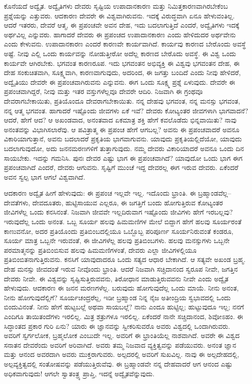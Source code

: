 ಕೊನೆಯದೆ ಅದ್ವೈತ. ಅದ್ವೈತಿಗಳು ದೇವರು ಸೃಷ್ಟಿಯ ಉಪಾದಾನಕಾರಣ ಮತ್ತು ನಿಮಿತ್ತಕಾರಣವಾಗಿರಬೇಕೆಂಬ ಪ್ರಶ್ನೆಯನ್ನು ಎತ್ತುವರು. ಆದಕಾರಣ ದೇವರೇ ಈ ವಿಶ್ವವಾಗಿರುವನು. ಇದಕ್ಕೆ ವಿರುದ್ಧವಾಗಿ ಏನೂ ಹೇಳುವಂತಿಲ್ಲ. ಆದರೆ ಇತರರು, ದೇವರೆ ಆತ್ಮ, ಈ ಪ್ರಪಂಚವೇ ಅವನ ದೇಹ, ಇದು ಬದಲಾಗುತ್ತಿದೆ ಎಂದರೆ, ಅದ್ವೈತಿಗಳು ಇದಕ್ಕೆ ಅರ್ಥವಿಲ್ಲ ಎನ್ನುವರು. ಹಾಗಾದರೆ ದೇವರು ಈ ಪ್ರಪಂಚದ ಉಪಾದಾನಕಾರಣ ಎಂದು ಹೇಳಿದುದರ ಅರ್ಥವೇನು ಎಂದು ಕೇಳುವನು. ಉಪಾದಾನಕಾರಣ ಎಂದರೆ ಕಾರಣವೇ ಕಾರ್ಯವಾಗಿದೆ. ಕಾರ್ಯವು ಕಾರಣದ ಬೇರೊಂದು ಅವಸ್ಥೆ ಅಷ್ಟೆ. ನೀವು ಎಲ್ಲಿ ಒಂದು ಕಾರ್ಯವನ್ನು ನೋಡುತ್ತೀರೋ ಅದೆಲ್ಲ ಕಾರಣದ ಬೇರೊದು ಅವಸ್ಥೆ. ಈ ವಿಶ್ವ ಒಂದು ಕಾರ್ಯವೇ ಆಗಿರಬೇಕು. ಭಗವಂತ ಕಾರಣರೂಪ. ಇದು ಭಗವಂತನ ಅಭಿವ್ಯಕ್ತಿ ಈ ವಿಶ್ವವು ಭಗವಂತನ ದೇಹ, ಈ ದೇಹ ಸಂಕುಚಿತವಾಗಿ, ಸೂಕ್ಷ್ಮವಾಗಿ, ಕಾರಣವಾಗುವುದು, ಅದರಿಂದ, ಈ ಜಗತ್ತು ಬಂದಿದೆ ಎಂದು ನೀವು ಹೇಳಿದರೆ, ಅದ್ವೈತಿಯು ದೇವರೇ ಈ ಪ್ರಪಂಚವಾಗಿರುವನು ಎನ್ನುವನು. ಈಗ ಒಂದು ಸೂಕ್ಷ್ಮ ಪ್ರಶ್ನೆ ಏಳುವುದು. ದೇವರೇ ಈ ಪ್ರಪಂಚವಾಗಿದ್ದರೆ, ನೀವು ಮತ್ತು ಇತರ ವಸ್ತುಗಳೆಲ್ಲವೂ ದೇವರೇ ಆದಿರಿ. ನಿಜವಾಗಿ ಈ ಗ್ರಂಥವೂ ದೇವರಾಗಬೇಕಾಯಿತು, ಪ್ರತಿಯೊಂದೂ ದೇವರಾಗಬೇಕಾಯಿತು. ನನ್ನ ದೇಹವು ಭಗವಂತ, ನನ್ನ ಮನಸ್ಸು ಭಗವಂತ, ನನ್ನ ಆತ್ಮ ಭಗವಂತ. ಹಾಗಾದರೆ ಇಷ್ಟೊಂದು ಜೀವಗಳು ಏಕೆ ಇವೆ? ದೇವರು ಕೋಟ್ಯಂತರ ಜೀವಗಳಾಗಿ ಭಾಗವಾದನೆ? ಆದರೆ, ಹೇಗೆ ಆದ? ಆ ಅಖಂಡವಾದ, ಅನಂತವಾದ ಏಕಮಾತ್ರ ಶಕ್ತಿ ಹೇಗೆ ಕವಲೊಡೆದು ಭಿನ್ನವಾಯಿತು? ನಾವು ಅನಂತವನ್ನು ವಿಭಾಗಿಸಲಾರೆವು. ಆ ಪವಿತ್ರಾತ್ಮ ಈ ಪ್ರಪಂಚ ಹೇಗೆ ಆಗಬಲ್ಲ? ಅವನು ಈ ಪ್ರಪಂಚವಾದರೆ ಅವನೂ ವಿಕಾರಿಯಾಗುತ್ತಾನೆ, ಅವನು ಬದಲಾದರೆ ಪ್ರಕೃತಿಯ ಭಾಗವಾಗುವನು. ಯಾವುದು ಪ್ರಕೃತಿಯಲ್ಲಿದೆಯೋ, ಯಾವುದು ಬದಲಾಗುವುದೋ, ಅದು ಜನನಮರಣಗಳಿಗೆ ತುತ್ತಾಗುವುದು. ನಮ್ಮ ದೇವರು ವಿಕಾರಿಯಾದರೆ ಅವನೂ ಒಂದು ದಿನ ಸಾಯಬೇಕು. ಇದನ್ನು ಗಮನಿಸಿ. ಪುನಃ ದೇವರ ಎಷ್ಟು ಭಾಗ ಈ ಪ್ರಪಂಚವಾಗಿದೆ? ಯಾವುದೋ ಒಂದು  ಭಾಗ ಈಗ ಪ್ರಪಂಚವಾಗಿದೆ ಎಂದರೆ, ದೇವರು  ಆಗುವನು. ಸೃಷ್ಟಿಗೆ ಮುಂಚೆ ಇದ್ದ ದೇವರಲ್ಲ ಈಗ ಇರುವ ದೇವರು. ಏಕೆಂದರೆ ಅವನ ಸ್ವಲ್ಪ ಭಾಗ ಆಗಲೆ ವಿಶ್ವವಾಗಿದೆ.

ಆದಕಾರಣ ಅದ್ವೈತ ಹೀಗೆ ಹೇಳುವುದು: ಈ ಪ್ರಪಂಚ ಇಲ್ಲವೇ ಇಲ್ಲ. ಇದೊಂದು ಭ್ರಾಂತಿ. ಈ ಬ್ರಹ್ಮಾಂಡವೆಲ್ಲ–ದೇವತೆಗಳು, ದೇವದೂತರು, ಹುಟ್ಟಿಸಾಯುವ ಎಲ್ಲರೂ, ಈ ಜಗತ್ತಿಗೆ ಬಂದು ಹೋಗುತ್ತಿರುವ ಕೋಟ್ಯಂತರ ಜೀವಿಗಳೆಲ್ಲ ಒಂದು ಕನಸಿನಂತೆ. ನಿಜವಾಗಿ ಜೀವವೇ ಇಲ್ಲದಿರುವಾಗ ಇಷ್ಟೊಂದು ಜೀವಿಗಳು ಹೇಗೆ ಇರಬಲ್ಲವು? ಇರುವುದೆಲ್ಲ ಒಂದು ಅನಂತ. ಒಬ್ಬ ಸೂರ್ಯ ಹಲವು ಹಿಮಮಣಿಗಳ ಮೇಲೆ ಬಿದ್ದಾಗ ಹೇಗೆ ಹಲವು ಸೂರ್ಯರಂತೆ ಕಾಣುವನೋ, ಅದರ ಪ್ರತಿಯೊಂದು ಪ್ರತಿಬಿಂಬದಲ್ಲಿಯೂ ಒಬ್ಬೊಬ್ಬ ಪರಿಪೂರ್ಣ ಸೂರ್ಯನಿರುವಂತೆ ಕಂಡರೂ, ಸೂರ್ಯ ಮಾತ್ರ ಒಬ್ಬನೇ ಇರುವಂತೆ, ಈ ಜೀವಿಗಳೆಲ್ಲ ಹಲವು ಪ್ರತಿಬಿಂಬಗಳು. ಹಲವು ಮನಸ್ಸುಗಳು ಒಬ್ಬನೇ ಪರಮಾತ್ಮನನ್ನು ಪ್ರತಿಬಿಂಬಿಸುವ ಹಲವು ಹಿಮಮಣಿಗಳಂತೆ, ದೇವರು ಎಲ್ಲಾ ಜೀವಿಗಳಲ್ಲಿಯೂ ಪ್ರತಿಬಿಂಬಿತನಾಗುತ್ತಿರುವನು. ಕನಸಿಗೆ ಯಾವುದಾದರೂ ಒಂದು ಸತ್ಯದ ಆಧಾರ ಬೇಕಾಗಿದೆ. ಆ ಸತ್ಯವೇ ಅಖಂಡ ಬ್ರಹ್ಮ. ದೇಹ ಮನಸ್ಸು ಜೀವದಂತೆ ಇರುವ ನೀವೊಂದು ಭ್ರಾಂತಿ. ಆದರೆ ನಿಜವಾಗಿ ಸಚ್ಚಿದಾನಂದ ಸ್ವರೂಪ ನೀವೇ, ಜಗತ್ತಿನ ದೇವರು ನೀವೇ. ಈ ವಿಶ್ವವನ್ನು ಸೃಷ್ಟಿಸುತ್ತಿರುವವನು, ತಿರೋಧಾನ ಮಾಡುತ್ತಿರುವವನು ನೀವೇ ಎಂದು ಅದ್ವೈತ ಹೇಳುವುದು. ಆದಕಾರಣ ಈ ಜನನ ಮರಣಗಳೆಲ್ಲ. ಬರುವುದು ಹೋಗುವುದೆಲ್ಲ ಒಂದು ಮಾಯೆ. ನೀನು ಅನಂತ, ನೀನು ಹೋಗುವುದೆಲ್ಲಿಗೆ? ಸೂರ್ಯಚಂದ್ರರೆಲ್ಲ, ಇಡೀ ಬ್ರಹ್ಮಾಂಡ ನಿನ್ನ ನೈಜ ಅತೀಂದ್ರಿಯ ಸ್ವಭಾವದಲ್ಲಿ ಒಂದು ಬಿಂದುವಿನಂತೆ. ನೀನು ಹೇಗೆ ಹುಟ್ಟಬಲ್ಲೆ ಅಥವಾ ಸಾಯಬಲ್ಲೆ? ನಾನು ಎಂದೂ ಹುಟ್ಟಿಲ್ಲ; ಹುಟ್ಟುವುದೂ ಇಲ್ಲ; ನನಗೆ ಎಂದಿಗೂ ತಾಯಿತಂದೆಗಳು ಇರಲಿಲ್ಲ. ಮಿತ್ರ ಶತ್ರುಗಳೂ ಇರಲಿಲ್ಲ. ಏಕೆಂದರೆ ನಾನೇ ಸಚ್ಚಿದಾನಂದ, ಶಿವೋಽಹಂ. ಈ ಸಿದ್ಧಾಂತದ ಪ್ರಕಾರ ಗುರಿ ಏನು? ಯಾರು ಈ ಜ್ಞಾನವನ್ನು ಸ್ವೀಕರಿಸುವರೊ ಅವರು ವಿಶ್ವದಲ್ಲಿ ಒಂದಾಗಿರುವರು. ಅವರಿಗೆ ಸ್ವರ್ಗಲೋಕ, ಬ್ರಹ್ಮಲೋಕ ಎಂಬುದೇ ಇಲ್ಲ. ಅವರಿಗೆ ಈ ಭ್ರಾಂತಿಯೆಲ್ಲ ನಾಶವಾಗಿದೆ. ಅವರೇ ಈ ವಿಶ್ವದ ಸನಾತನ ದೇವರೆಂದು ಅವರಿಗೆ ಅರಿವಾಗಿದೆ. ಅವರು ತಮ್ಮ ನಿಜವಾದ ವ್ಯಕ್ತಿತ್ವವನ್ನು ಪಡೆಯುವರು. ಅನಂತ ಜ್ಞಾನ ಮತ್ತು ಆನಂದ ಅವರದಾಗಿ ಅವರು ಮುಕ್ತರಾಗುವರು. ಅಲ್ಪದರಲ್ಲಿ ಅವರಿಗೆ ಸುಖವಿಲ್ಲ. ನಾವು ಈ ಅಲ್ಪದೇಹದಲ್ಲಿ, ಅಲ್ಪವ್ಯಕ್ತಿತ್ವದಲ್ಲಿ ಸಂತೋಷವನ್ನು ಪಡೆಯುತ್ತಿರುವೆವು. ಈ ಬ್ರಹ್ಮಾಂಡವೇ ನನ್ನ ದೇಹವಾದರೆ ಆಗ ಆನಂದ ಎಷ್ಟು ಅಧಿಕವಾಗುವುದು! ಆಗಲೇ ಸ್ವಾತಂತ್ರ್ಯ ಪ್ರಾಪ್ತಿ, ಇದನ್ನೆ ಅದ್ವೈತವೆನ್ನುವುದು.

